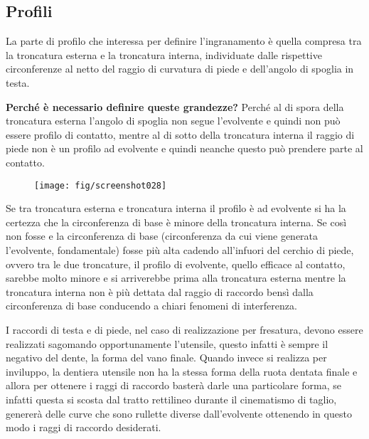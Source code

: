 \documentclass[a4paper, 15pt]{article}
\begin{document}
\subsection{Profili}
\begin{adjustwidth}{2in}{}			
		La parte di profilo che interessa per definire l'ingranamento è quella compresa tra la troncatura esterna e la troncatura interna, individuate dalle rispettive circonferenze al netto del raggio di curvatura di piede e dell'angolo di spoglia in testa. \newline 
		
		\textbf{Perché è necessario definire queste grandezze?} Perché al di spora della troncatura esterna l'angolo di spoglia non segue l'evolvente e quindi non può essere profilo di contatto, mentre al di sotto della troncatura interna il raggio di piede non è un profilo ad evolvente e quindi neanche questo può prendere parte al contatto.
		\begin{figure}[H]
			\centering
			\texttt{[image: fig/screenshot028]}
			\label{fig:screenshot028}
		\end{figure}		
		Se tra troncatura esterna e troncatura interna il profilo è ad evolvente si ha la certezza che la circonferenza di base è minore della troncatura interna. Se così non fosse e la circonferenza di base (circonferenza da cui viene generata l'evolvente, fondamentale) fosse più alta cadendo all'infuori del cerchio di piede, ovvero tra le due troncature, il profilo di evolvente, quello efficace al contatto, sarebbe molto minore e si arriverebbe prima alla troncatura esterna mentre la troncatura interna non è più dettata dal raggio di raccordo bensì dalla circonferenza di base conducendo a chiari fenomeni di interferenza.
		
		I raccordi di testa e di piede, nel caso di realizzazione per fresatura, devono essere realizzati sagomando opportunamente l'utensile, questo infatti è sempre il negativo del dente, la forma del vano finale. Quando invece si realizza per inviluppo, la dentiera utensile non ha la stessa forma della ruota dentata finale e allora per ottenere i raggi di raccordo basterà darle una particolare forma, se infatti questa si scosta dal tratto rettilineo durante il cinematismo di taglio, genererà delle curve che sono rullette diverse dall'evolvente ottenendo in questo modo i raggi di raccordo desiderati.	
\end{adjustwidth}
\end{document}
